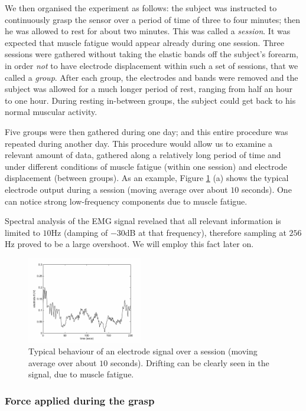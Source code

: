 We then organised the experiment as follows: the subject was
instructed to continuously grasp the sensor over a period of time of
three to four minutes; then he was allowed to rest for about two
minutes. This was called a \emph{session}. It was expected that muscle
fatigue would appear already during one session. Three sessions were
gathered without taking the elastic bands off the subject's forearm,
in order \emph{not} to have electrode displacement within such a set
of sessions, that we called a \emph{group}. After each group, the
electrodes and bands were removed and the subject was allowed for a
much longer period of rest, ranging from half an hour to one
hour. During resting in-between groups, the subject could get back to
his normal muscular activity.

Five groups were then gathered during one day; and this entire procedure was
repeated during another day. This procedure would allow us to
examine a relevant amount of data, gathered along a relatively long
period of time and under different conditions of muscle fatigue
(within one session) and electrode displacement (between groups). As
an example, Figure \ref{fig:drift} (a) shows the typical
electrode output during a session (moving average over about $10$
seconds). One can notice strong low-frequency components due to muscle
fatigue.

Spectral analysis of the EMG signal revelaed that all relevant
information is limited to $10$Hz (damping of $-30$dB at that
frequency), therefore sampling at $256$Hz proved to be a large
overshoot. We will employ this fact later on.

\begin{figure}[!ht] \centering
  \includegraphics[width=0.45\textwidth]{figs/el8_movingAvg_s1.png}
  \caption{Typical behaviour of an electrode signal over a
    session (moving average over about $10$ seconds). Drifting can be
    clearly seen in the signal, due to muscle fatigue.}
  \label{fig:drift}
\end{figure}

\subsubsection{Force applied during the grasp}

